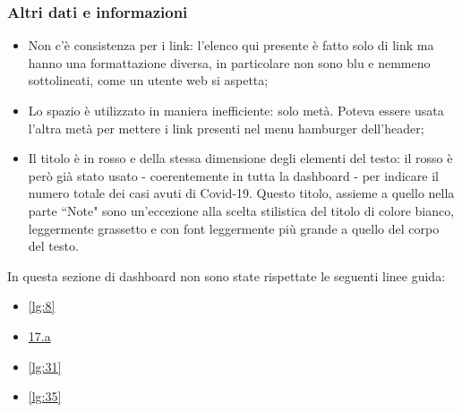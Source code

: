 \subsubsection{Altri dati e informazioni}
\label{sss:altri-dati-informazioni}
\begin{itemize}
    \item Non c'è consistenza per i link: l'elenco qui presente è fatto solo di link ma hanno una formattazione diversa, in particolare non sono blu e nemmeno sottolineati, come un utente web si aspetta;
    \item Lo spazio è utilizzato in maniera inefficiente: solo metà. Poteva essere usata l'altra metà per mettere i link presenti nel menu hamburger dell'header;
    \item Il titolo è in rosso e della stessa dimensione degli elementi del testo: il rosso è però già stato usato - coerentemente in tutta la dashboard - per indicare il numero totale dei casi avuti di Covid-19. Questo titolo, assieme a quello nella parte ``Note" sono un'eccezione alla scelta stilistica del titolo di colore bianco, leggermente grassetto e con font leggermente più grande a quello del corpo del testo.
\end{itemize}
In questa sezione di dashboard non sono state rispettate le seguenti linee guida:
\begin{itemize}
    \item \ref{lg:8}
    \item \hyperref[lg:17.a]{17.a}
    \item \ref{lg:31}
    \item \ref{lg:35}
\end{itemize}

